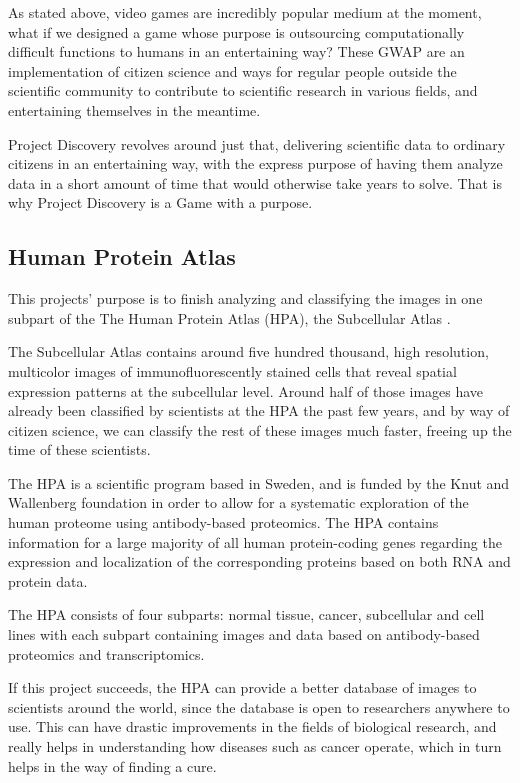 As stated above, video games are incredibly popular medium at the moment, what if we designed a game whose purpose is outsourcing computationally difficult functions to humans in an entertaining way? These GWAP are an implementation of citizen science and ways for regular people outside the scientific community to contribute to scientific research in various fields, and entertaining themselves in the meantime.

Project Discovery revolves around just that, delivering scientific data to ordinary citizens in an entertaining way, with the express purpose of having them analyze data in a short amount of time that would otherwise take years to solve. That is why Project Discovery is a Game with a purpose.

\subsection{Human Protein Atlas}

This projects' purpose is to finish analyzing and classifying the images in one subpart of the The Human Protein Atlas (HPA), the Subcellular Atlas \cite{subcellatlas}.

The Subcellular Atlas contains around five hundred thousand, high resolution, multicolor images of immunofluorescently stained cells that reveal spatial expression patterns at the subcellular level. Around half of those images have already been classified by scientists at the HPA the past few years, and by way of citizen science, we can classify the rest of these images much faster, freeing up the time of these scientists.

The HPA is a scientific program based in Sweden, and is funded by the 
Knut and Wallenberg foundation in order to allow for a systematic exploration of the human proteome using antibody-based proteomics. The HPA contains information for a large majority of all human protein-coding genes regarding the expression and localization of the corresponding proteins based on both RNA and protein data.

The HPA consists of four subparts: normal tissue, cancer, subcellular and cell lines with each subpart containing images and data based on antibody-based proteomics and transcriptomics.

If this project succeeds, the HPA can provide a better database of images to scientists around the world, since the database is open to researchers anywhere to use. This can have drastic improvements in the fields of biological research, and really helps in understanding how diseases such as cancer operate, which in turn helps in the way of finding a cure. 

